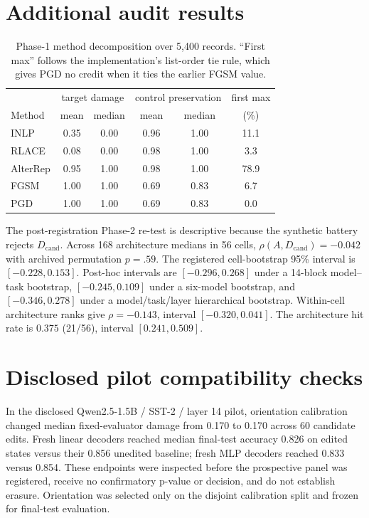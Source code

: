 \documentclass{article}
\newcommand{\Dcand}{D_{\mathrm{cand}}}
\newcommand{\ConstructCell}{Qwen2.5-1.5B / SST-2 / layer 14}
\newcommand{\ConstructCandidates}{60}
\newcommand{\ConstructRawMedian}{0.170}
\newcommand{\ConstructOrientedMedian}{0.170}
\newcommand{\ConstructFreshLinear}{0.826}
\newcommand{\ConstructFreshMLP}{0.833}
\newcommand{\ConstructFreshLinearBaseline}{0.856}
\newcommand{\ConstructFreshMLPBaseline}{0.854}
\begin{document}
\section{Additional audit results}

\begin{table}[ht]
\centering
\small
\begin{tabular}{lccccc}
\toprule
 & \multicolumn{2}{c}{target damage} & \multicolumn{2}{c}{control preservation} & first max \\
Method & mean & median & mean & median & (\%) \\
\midrule
INLP     & 0.35 & 0.00 & 0.96 & 1.00 & 11.1 \\
RLACE    & 0.08 & 0.00 & 0.98 & 1.00 & 3.3 \\
AlterRep & 0.95 & 1.00 & 0.98 & 1.00 & 78.9 \\
FGSM     & 1.00 & 1.00 & 0.69 & 0.83 & 6.7 \\
PGD      & 1.00 & 1.00 & 0.69 & 0.83 & 0.0 \\
\bottomrule
\end{tabular}
\caption{Phase-1 method decomposition over 5,400 records. ``First max'' follows the implementation's list-order tie rule, which gives PGD no credit when it ties the earlier FGSM value.}
\label{tab:methods-app}
\end{table}

The post-registration Phase-2 re-test is descriptive because the synthetic battery rejects $\Dcand$. Across 168 architecture medians in 56 cells, $\rho(A,\Dcand)=-0.042$ with archived permutation $p=.59$. The registered cell-bootstrap 95\% interval is $[-0.228,0.153]$. Post-hoc intervals are $[-0.296,0.268]$ under a 14-block model--task bootstrap, $[-0.245,0.109]$ under a six-model bootstrap, and $[-0.346,0.278]$ under a model/task/layer hierarchical bootstrap. Within-cell architecture ranks give $\rho=-0.143$, interval $[-0.320,0.041]$. The architecture hit rate is $0.375$ (21/56), interval $[0.241,0.509]$.

\section{Disclosed pilot compatibility checks}
\label{app:pilot-compatibility}
In the disclosed \ConstructCell{} pilot, orientation calibration changed median fixed-evaluator damage from \ConstructRawMedian{} to \ConstructOrientedMedian{} across \ConstructCandidates{} candidate edits. Fresh linear decoders reached median final-test accuracy \ConstructFreshLinear{} on edited states versus their \ConstructFreshLinearBaseline{} unedited baseline; fresh MLP decoders reached \ConstructFreshMLP{} versus \ConstructFreshMLPBaseline{}. These endpoints were inspected before the prospective panel was registered, receive no confirmatory p-value or decision, and do not establish erasure. Orientation was selected only on the disjoint calibration split and frozen for final-test evaluation.
\end{document}
